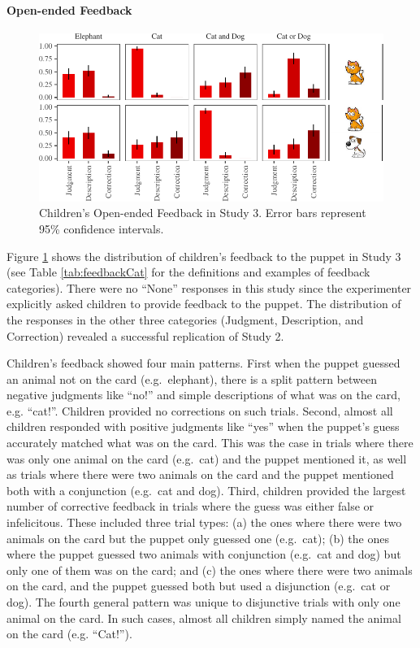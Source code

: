 \documentclass[man]{apa6}
\theoremstyle{definition}
\theoremstyle{definition}
\theoremstyle{definition}
\theoremstyle{remark}
\begin{document}
\paragraph{Open-ended Feedback}\label{open-ended-feedback}

\begin{figure}[h]

{\centering \includegraphics{figs/feedbackStudy3-1} 

}

\caption{Children's Open-ended Feedback in Study 3. Error bars represent 95\% confidence intervals.}\label{fig:feedbackStudy3}
\end{figure}

Figure \ref{fig:feedbackStudy3} shows the distribution of children's
feedback to the puppet in Study 3 (see Table \ref{tab:feedbackCat} for
the definitions and examples of feedback categories). There were no
\enquote{None} responses in this study since the experimenter explicitly
asked children to provide feedback to the puppet. The distribution of
the responses in the other three categories (Judgment, Description, and
Correction) revealed a successful replication of Study 2.

Children's feedback showed four main patterns. First when the puppet
guessed an animal not on the card (e.g.~elephant), there is a split
pattern between negative judgments like \enquote{no!} and simple
descriptions of what was on the card, e.g. \enquote{cat!}. Children
provided no corrections on such trials. Second, almost all children
responded with positive judgments like \enquote{yes} when the puppet's
guess accurately matched what was on the card. This was the case in
trials where there was only one animal on the card (e.g.~cat) and the
puppet mentioned it, as well as trials where there were two animals on
the card and the puppet mentioned both with a conjunction (e.g.~cat and
dog). Third, children provided the largest number of corrective feedback
in trials where the guess was either false or infelicitous. These
included three trial types: (a) the ones where there were two animals on
the card but the puppet only guessed one (e.g.~cat); (b) the ones where
the puppet guessed two animals with conjunction (e.g.~cat and dog) but
only one of them was on the card; and (c) the ones where there were two
animals on the card, and the puppet guessed both but used a disjunction
(e.g.~cat or dog). The fourth general pattern was unique to disjunctive
trials with only one animal on the card. In such cases, almost all
children simply named the animal on the card (e.g. \enquote{Cat!}).
\end{document}
